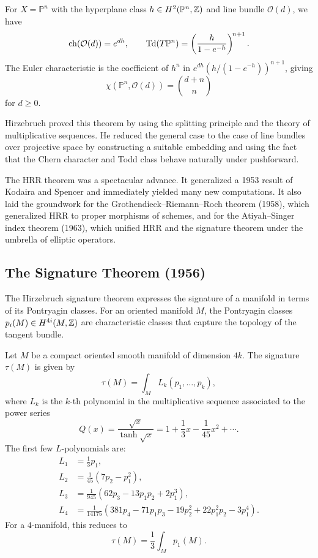 \begin{example}
For \(X = \mathbb{P}^n\) with the hyperplane class
\(h \in H^2(\mathbb{P}^n, \mathbb{Z})\) and line bundle \(\mathcal{O}(d)\),
we have
\[
\operatorname{ch}(\mathcal{O}(d)) = e^{dh},
\qquad
\operatorname{Td}(T\mathbb{P}^n) = \left(\frac{h}{1 - e^{-h}}\right)^{\!n+1}.
\]
The Euler characteristic is the coefficient of \(h^n\) in
\(e^{dh} (h/(1 - e^{-h}))^{n+1}\), giving
\[
\chi(\mathbb{P}^n, \mathcal{O}(d)) = \binom{d + n}{n}
\]
for \(d \ge 0\).
\end{example}

Hirzebruch proved this theorem by using the splitting principle and the
theory of multiplicative sequences. He reduced the general case to the
case of line bundles over projective space by constructing a suitable
embedding and using the fact that the Chern character and Todd class
behave naturally under pushforward.

The HRR theorem was a spectacular advance. It generalized a 1953 result
of Kodaira and Spencer and immediately yielded many new computations.
It also laid the groundwork for the Grothendieck--Riemann--Roch theorem
(1958), which generalized HRR to proper morphisms of schemes, and for
the Atiyah--Singer index theorem (1963), which unified HRR and the
signature theorem under the umbrella of elliptic operators.

\subsection{The Signature Theorem (1956)}

The Hirzebruch signature theorem expresses the signature of a manifold
in terms of its Pontryagin classes. For an oriented manifold \(M\), the
Pontryagin classes \(p_i(M) \in H^{4i}(M, \mathbb{Z})\) are characteristic
classes that capture the topology of the tangent bundle.

\begin{theorem}
Let \(M\) be a compact oriented smooth manifold of dimension \(4k\).
The signature \(\tau(M)\) is given by
\[
\tau(M) = \int_M L_k(p_1, \dots, p_k),
\]
where \(L_k\) is the \(k\)-th polynomial in the multiplicative sequence
associated to the power series
\[
Q(x) = \frac{\sqrt{x}}{\tanh\sqrt{x}}
= 1 + \frac13 x - \frac1{45} x^2 + \cdots.
\]
The first few \(L\)-polynomials are:
\[
\begin{aligned}
L_1 &= \frac13 p_1,\\[2pt]
L_2 &= \frac1{45}(7p_2 - p_1^2),\\[2pt]
L_3 &= \frac1{945}(62p_3 - 13p_1 p_2 + 2p_1^3),\\[2pt]
L_4 &= \frac1{14175}(381p_4 - 71p_1 p_3 - 19p_2^2 + 22p_1^2 p_2
- 3p_1^4).
\end{aligned}
\]
For a \(4\)-manifold, this reduces to
\[
\tau(M) = \frac13 \int_M p_1(M).
\]
\end{theorem}

